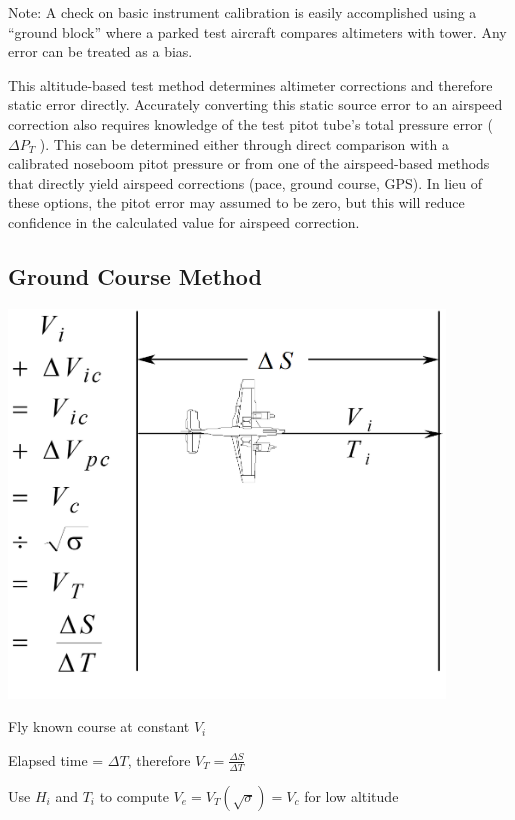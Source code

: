 \documentclass[
]{book}
\begin{document}
Note: A check on basic instrument calibration is easily accomplished using a ``ground block'' where a parked test aircraft compares altimeters with tower. Any error can be treated as a bias.

This altitude-based test method determines altimeter corrections and therefore static error directly. Accurately converting this static source error to an airspeed correction also requires knowledge of the test pitot tube's total pressure error (\(\Delta P_T\) ). This can be determined either through direct comparison with a calibrated noseboom pitot pressure or from one of the airspeed-based methods that directly yield airspeed corrections (pace, ground course, GPS). In lieu of these options, the pitot error may assumed to be zero, but this will reduce confidence in the calculated value for airspeed correction.

\hypertarget{ground-course-method}{%
\subsection{Ground Course Method}\label{ground-course-method}}

\includegraphics[width=4.5625in,height=4.0625in]{media/04/image19.png}

Fly known course at constant \(V_i\)

Elapsed time = \(\Delta T\), therefore \(V_T = \frac{\Delta S}{\Delta T}\)

Use \(H_i\) and \(T_i\) to compute \(V_e = V_T \left(\sqrt{\sigma} \right) = V_c\) for low altitude
\end{document}
